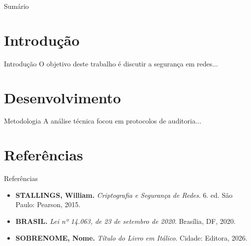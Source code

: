 \documentclass[aspectratio=169]{beamer}
\begin{document}
\gerarCapa

\begin{frame}{Sumário}
    \tableofcontents
\end{frame}

\section{Introdução}
\begin{frame}{Introdução}
    O objetivo deste trabalho é discutir a segurança em redes...
\end{frame}

\section{Desenvolvimento}
\begin{frame}{Metodologia}
    A análise técnica focou em protocolos de auditoria...
\end{frame}

\section{Referências}
\begin{frame}{Referências}
\fontsize{8}{10}\selectfont
\begin{itemize}
    \item \textbf{STALLINGS, William.} \textit{Criptografia e Segurança de Redes}. 6. ed. São Paulo: Pearson, 2015.
    \item \textbf{BRASIL.} \textit{Lei nº 14.063, de 23 de setembro de 2020}. Brasília, DF, 2020.
    \item \textbf{SOBRENOME, Nome.} \textit{Título do Livro em Itálico}. Cidade: Editora, 2026.
\end{itemize}
\end{frame}
\end{document}
